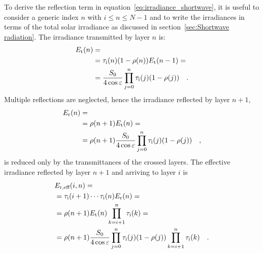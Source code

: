 \documentclass[a4paper,10pt,twocolumn,\classoptions]{article}
\begin{document}
To derive the reflection term in equation~\ref{eq:irradiance_shortwave}, it is useful to consider a generic index $n$ with $i \leq n \leq N - 1$ and to write the irradiances in terms of the total solar irradiance as discussed in section~\ref{sec:Shortwave radiation}.
The irradiance transmitted by layer $n$ is:
\begin{equation}
  \label{eq:irradiance_transmitted}
  \begin{split}
    E_\text{t}(n) & = \\
    & = \tau_\text{i}(n) (1 - \rho(n)) E_\text{t}(n - 1) = \\
    & = \frac{S_0}{4 \cos \varepsilon} \prod_{j = 0}^{n} \tau_\text{i}(j) (1 - \rho(j))
    \quad .
  \end{split}
\end{equation}
Multiple reflections are neglected, hence the irradiance reflected by layer $n + 1$,
\begin{equation}
  \label{eq:irradiance_reflected}
  \begin{split}
    E_\text{r}(n) & = \\
    & = \rho(n + 1) E_\text{t}(n) = \\
    & = \rho(n + 1) \frac{S_0}{4 \cos \varepsilon} \prod_{j = 0}^{n} \tau_\text{i}(j) (1 - \rho(j))
    \quad ,
  \end{split}
\end{equation}
is reduced only by the transmittances of the crossed layers.
The effective irradiance reflected by layer $n + 1$ and arriving to layer $i$ is
\begin{equation}
  \label{eq:irradiance_reflected_effective}
  \begin{split}
    & E_{\text{r},\text{eff}}(i, n) = \\
    & = \tau_\text{i}(i + 1) \cdots \tau_\text{i}(n) E_\text{r}(n) = \\
    & = \rho(n + 1) E_\text{t}(n) \prod_{k = i + 1}^{n} \tau_\text{i}(k) = \\
    & = \rho(n + 1) \frac{S_0}{4 \cos \varepsilon} \prod_{j = 0}^{n} \tau_\text{i}(j) (1 - \rho(j)) \prod_{k = i + 1}^{n} \tau_\text{i}(k)
    \quad .
  \end{split}
\end{equation}
\end{document}

